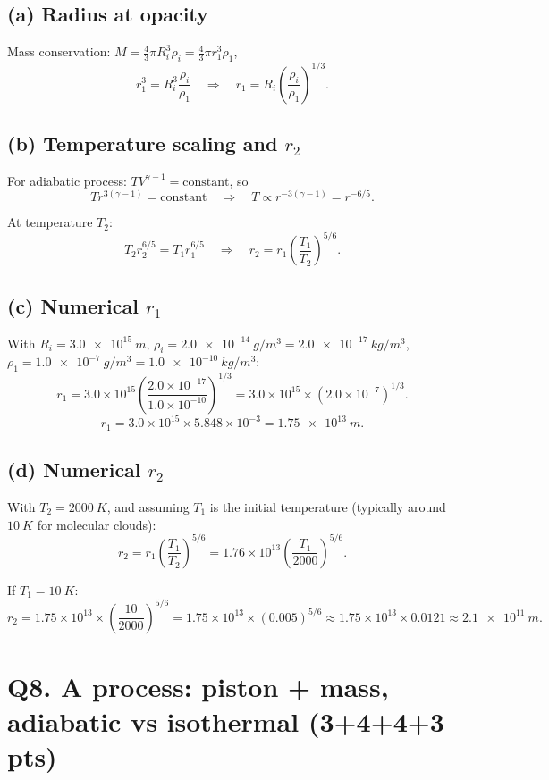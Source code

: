 \documentclass[11pt]{article}
\newcommand{\ans}[1]{\boxed{\displaystyle #1}}
\begin{document}
\subsection*{(a) Radius at opacity}
Mass conservation: \(M = \frac{4}{3}\pi R_i^3 \rho_i = \frac{4}{3}\pi r_1^3 \rho_1\),
\[
r_1^3 = R_i^3 \frac{\rho_i}{\rho_1}
\quad\Rightarrow\quad
r_1 = R_i \left(\frac{\rho_i}{\rho_1}\right)^{1/3}.
\]

\subsection*{(b) Temperature scaling and \(r_2\)}
For adiabatic process: \(T V^{\gamma-1} = \text{constant}\), so
\[
T r^{3(\gamma-1)} = \text{constant}
\quad\Rightarrow\quad
T \propto r^{-3(\gamma-1)} = r^{-6/5}.
\]

At temperature \(T_2\):
\[
T_2 r_2^{6/5} = T_1 r_1^{6/5}
\quad\Rightarrow\quad
r_2 = r_1 \left(\frac{T_1}{T_2}\right)^{5/6}.
\]

\subsection*{(c) Numerical \(r_1\)}
With \(R_i = \SI{3.0e15}{m}\),
\(\rho_i = \SI{2.0e-14}{g/m^3} = \SI{2.0e-17}{kg/m^3}\),
\(\rho_1 = \SI{1.0e-7}{g/m^3} = \SI{1.0e-10}{kg/m^3}\):
\[
r_1 = 3.0 \times 10^{15} \left(\frac{2.0 \times 10^{-17}}{1.0 \times 10^{-10}}\right)^{1/3}
= 3.0 \times 10^{15} \times (2.0 \times 10^{-7})^{1/3}.
\]
\[
r_1 = 3.0 \times 10^{15} \times 5.848 \times 10^{-3}
= \ans{\SI{1.75e13}{m}}.
\]

\subsection*{(d) Numerical \(r_2\)}
With \(T_2 = \SI{2000}{K}\), and assuming \(T_1\) is the initial temperature
(typically around \(\SI{10}{K}\) for molecular clouds):
\[
r_2 = r_1 \left(\frac{T_1}{T_2}\right)^{5/6}
= 1.76 \times 10^{13} \left(\frac{T_1}{2000}\right)^{5/6}.
\]

If \(T_1 = \SI{10}{K}\):
\[
r_2 = 1.75 \times 10^{13} \times \left(\frac{10}{2000}\right)^{5/6}
= 1.75 \times 10^{13} \times (0.005)^{5/6}
\approx 1.75 \times 10^{13} \times 0.0121
\approx \ans{\SI{2.1e11}{m}}.
\]

\section*{Q8. A process: piston + mass, adiabatic vs isothermal (3+4+4+3 pts)}
\end{document}
